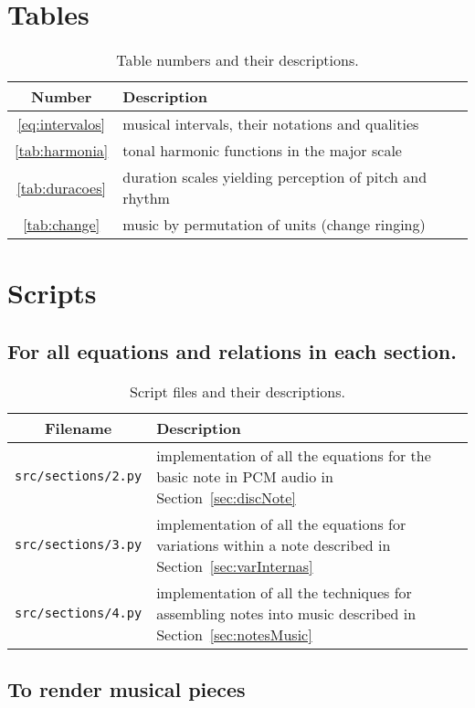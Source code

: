 \documentclass{scrreprt}
\newcommand*{\reff}[1]{%
	{\NoHyper\ref{#1}\endNoHyper}%
	  }
\begin{document}
\clearpage
\section{Tables}

\begin{table*}[htp!]
\centering
\caption{Table numbers and their descriptions.}
\begin{tabular}{ c | p{12cm} }
   Number & Description \\\hline
 \reff{eq:intervalos} & musical intervals, their notations and qualities \\
 \reff{tab:harmonia} & tonal harmonic functions in the major scale \\
 \reff{tab:duracoes} & duration scales yielding perception of pitch and rhythm \\
 \reff{tab:change} & music by permutation of units (change ringing) \\
\end{tabular}
\end{table*}

\clearpage
\section{Scripts}
\subsection{For all equations and relations in each section.}

\begin{table*}[htp!]
\centering
\caption{Script files and their descriptions.}
\begin{tabular}{ c | p{12cm} }
   Filename & Description \\\hline
  \texttt{src/sections/2.py} & implementation of all the equations for the basic note in PCM audio in Section~\ref{sec:discNote} \\
  \texttt{src/sections/3.py} & implementation of all the equations for variations within a note described in Section~\ref{sec:varInternas} \\
  \texttt{src/sections/4.py} & implementation of all the techniques for assembling notes into music described in Section~\ref{sec:notesMusic} \\
\end{tabular}
\end{table*}

\clearpage
\subsection{To render musical pieces}
\end{document}
